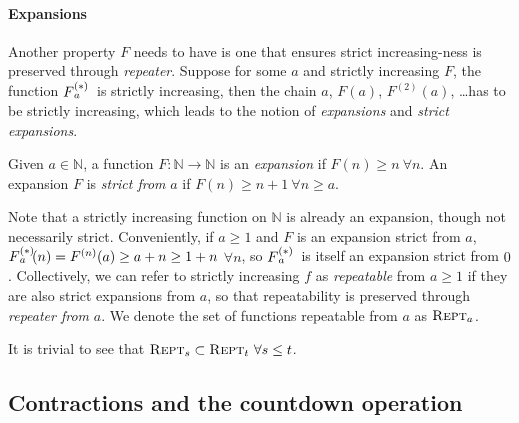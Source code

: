 \paragraph{Expansions} Another property $F$ needs to have is one that ensures strict increasing-ness is preserved through \emph{repeater}. Suppose for some $a$ and strictly increasing $F$, the function $\rf{F}{a}\ $ is strictly increasing, then the chain $a$, $F(a)$, $F^{(2)}(a)$, \ldots has to be strictly increasing, which leads to the notion of \emph{expansions} and \emph{strict expansions}.
\begin{defn}
Given $a\in \mathbb{N}$, a function $F:\mathbb{N}\to\mathbb{N}$ is an \emph{expansion} if $F(n)\ge n \ \forall n$. An expansion $F$ is \emph{strict from} $a$ if $F(n)\ge n+1 \ \forall n\ge a$.
\end{defn}
Note that a strictly increasing function on $\mathbb{N}$ is already an expansion, though not necessarily strict. Conveniently, if $a\ge 1$ and $F$ is an expansion strict from $a$, $\rf{F}{a}(n) = F^{(n)}(a) \ge a + n \ge 1 + n$ $\forall n$, so $\rf{F}{a}\ $ is itself an expansion strict from $0$. Collectively, we can refer to strictly increasing $f$ as \emph{repeatable} from $a\ge 1$ if they are also strict expansions from $a$, so that repeatability is preserved through \emph{repeater from} $a$. We denote the set of functions repeatable from $a$ as $\text{\scshape{Rept}}_a$.
\begin{rem} \label{rem: repeatable-subset}
	It is trivial to see that $\text{\scshape{Rept}}_s \subset \text{\scshape{Rept}}_t \ \forall s\le t $.
\end{rem}

\subsection{Contractions and the countdown operation}

